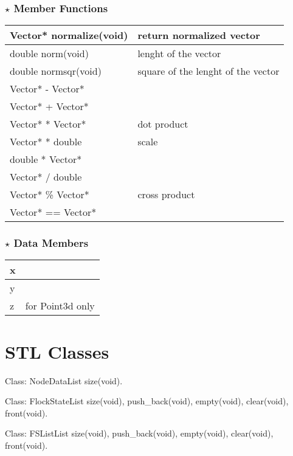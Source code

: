 \documentclass[onecolumn,10pt]{article}
\begin{document}
\subsubsection*{$\star$ Member Functions}

\begin{tabular}{l|l}
Vector* normalize(void)  & return normalized vector \\\hline 
double norm(void)        & lenght of the vector \\\hline 
double normsqr(void)     & square of the lenght of the vector \\\hline 
Vector* -  Vector*    & \\\hline 
Vector* +  Vector*    & \\\hline 
Vector* *  Vector*    & dot product \\\hline 
Vector* *  double     & scale \\\hline 
double  *  Vector*    &  \\\hline 
Vector* /  double     &  \\\hline 
Vector* \%  Vector*   & cross product \\\hline 
Vector* == Vector*    & \\
\end{tabular}

\subsubsection*{$\star$ Data Members}

\begin{tabular}{l|l}
x  & \\\hline
y  & \\\hline
z  & for Point3d only \\
\end{tabular}


\section{STL Classes}

Class:
NodeDataList      %
size(void).

Class:
FlockStateList    %
size(void), push\_back(void), empty(void), clear(void), front(void).

Class:
FSListList        %
size(void), push\_back(void), empty(void), clear(void), front(void).
\end{document}
